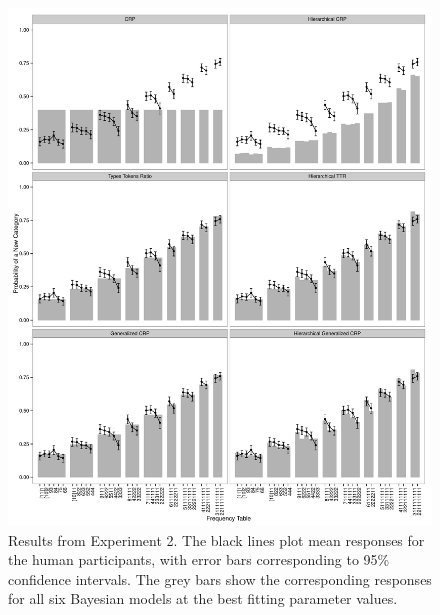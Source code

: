 \documentclass[doc]{apa6}
\begin{document}
\begin{figure}[p]
\begin{center}
\includegraphics[scale=.55]{fit2.pdf}
\caption{Results from Experiment 2. The black lines plot mean responses for the human participants, with error bars corresponding to 95\% confidence intervals. The grey bars show the corresponding responses for all six Bayesian models at the best fitting parameter values.}
\label{fig:exp2}
\end{center}
\end{figure}
\end{document}

